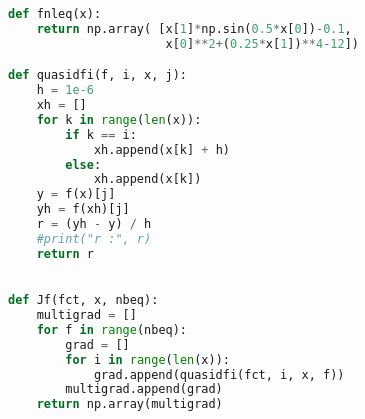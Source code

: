 \begin{lstlisting}[language=Python, style=jupycolors]
def fnleq(x):
    return np.array( [x[1]*np.sin(0.5*x[0])-0.1, 
                      x[0]**2+(0.25*x[1])**4-12])

def quasidfi(f, i, x, j):
    h = 1e-6
    xh = []
    for k in range(len(x)):
        if k == i:
            xh.append(x[k] + h)
        else:
            xh.append(x[k])
    y = f(x)[j]
    yh = f(xh)[j]
    r = (yh - y) / h
    #print("r :", r)
    return r
        

def Jf(fct, x, nbeq):
    multigrad = []
    for f in range(nbeq):
        grad = []
        for i in range(len(x)):
            grad.append(quasidfi(fct, i, x, f))
        multigrad.append(grad)
    return np.array(multigrad)
\end{lstlisting}